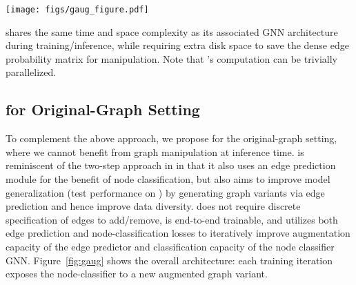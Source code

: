 \documentclass[letterpaper]{article} \usepackage{aaai21}  \usepackage{times}  \usepackage{helvet} \usepackage{courier}  \usepackage[hyphens]{url}  \usepackage{graphicx} \urlstyle{rm} \def\UrlFont{\rm}  \usepackage{natbib}  \usepackage{caption} \frenchspacing  \setlength{\pdfpagewidth}{8.5in}  \setlength{\pdfpageheight}{11in}
\begin{document}
\begin{figure*}[t]
    \centering
    \texttt{[image: figs/gaug\_figure.pdf]}
    \caption{\method is comprised of three main components: (1) a differentiable edge predictor which produces edge probability estimates, (2) an interpolation and sampling step which produces sparse graph variants, and (3) a GNN which learns embeddings for node classification using these variants.  The model is trained end-to-end with both classification and edge prediction losses.
    } \label{fig:gaug}
\end{figure*}

\methodtwo shares the same time and space complexity as its associated GNN architecture during training/inference, while requiring extra disk space to save the dense  edge probability matrix  for manipulation. Note that 's computation can be trivially parallelized. 





\subsection{\method for Original-Graph Setting}



To complement the above approach, we propose \method for the original-graph setting, where we cannot benefit from graph manipulation at inference time.  \method is reminiscent of the two-step approach in \methodshared in that it also uses an edge prediction module for the benefit of node classification, but also aims to improve model generalization (test performance on ) by generating graph variants  via edge prediction and hence improve data diversity.  \method does not require discrete specification of edges to add/remove, is end-to-end trainable, and utilizes both edge prediction and node-classification losses to iteratively improve augmentation capacity of the edge predictor and classification capacity of the node classifier GNN.  Figure~\ref{fig:gaug} shows the overall architecture: each training iteration exposes the node-classifier to a new augmented graph variant.
\end{document}
